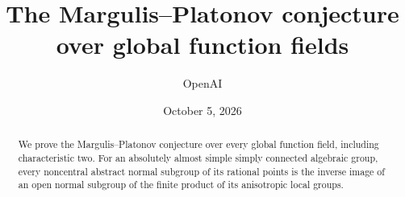 \documentclass[11pt]{article}
\title{The Margulis--Platonov conjecture\\over global function fields}
\author{OpenAI}
\date{October 5, 2026}
\begin{document}
\maketitle
\begin{abstract}
We prove the Margulis--Platonov conjecture over every global function field,
including characteristic two. For an absolutely almost simple simply connected
algebraic group, every noncentral abstract normal subgroup of its rational
points is the inverse image of an open normal subgroup of the finite product
of its anisotropic local groups.
\end{abstract}
\tableofcontents










\appendix



\end{document}

